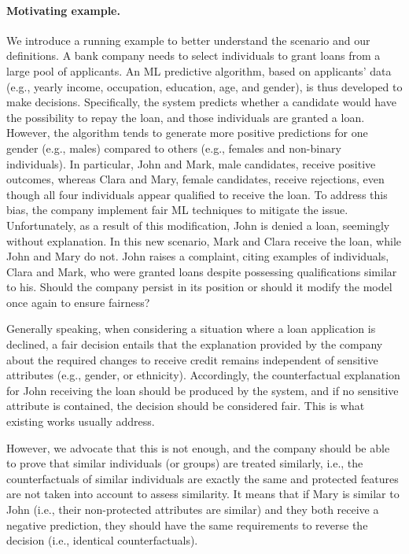 \documentclass[letterpaper]{article} %
\begin{document}
\paragraph{Motivating example.}
We introduce a running example to better understand the scenario and our definitions. A bank company needs to select individuals to grant loans from a large pool of applicants. An ML predictive algorithm, based on applicants' data (e.g., yearly income, occupation, education, age, and gender), is thus developed to make decisions. Specifically, the system predicts whether a candidate would have the possibility to repay the loan, and those individuals are granted a loan. However, the algorithm tends to generate more positive predictions for one gender (e.g., males) compared to others (e.g., females and non-binary individuals). In particular, John and Mark, male candidates, receive positive outcomes, whereas Clara and Mary, female candidates, receive rejections, even though all four individuals appear qualified to receive the loan. To address this bias, the company implement fair ML techniques to mitigate the issue. Unfortunately, as a result of this modification, John is denied a loan, seemingly without explanation. In this new scenario, Mark and Clara receive the loan, while John and Mary do not. John raises a complaint, citing examples of individuals, Clara and Mark, who were granted loans despite possessing qualifications similar to his. Should the company persist in its position or should it modify the model once again to ensure fairness?

Generally speaking, when considering a situation where a loan application is declined, a fair decision entails that the explanation provided by the company about the required changes to receive credit remains independent of sensitive attributes (e.g., gender, or ethnicity). Accordingly, the counterfactual explanation for John receiving the loan should be produced by the system, and if no sensitive attribute is contained, the decision should be considered fair. This is what existing works usually address.

However, we advocate that this is not enough, and the company should be able to prove that similar individuals (or groups) are treated similarly, i.e., the counterfactuals of similar individuals are exactly the same and protected features are not taken into account to assess similarity. It means that if Mary is similar to John (i.e., their non-protected attributes are similar) and they both receive a negative prediction, they should have the same requirements to reverse the decision (i.e., identical counterfactuals).
\end{document}
